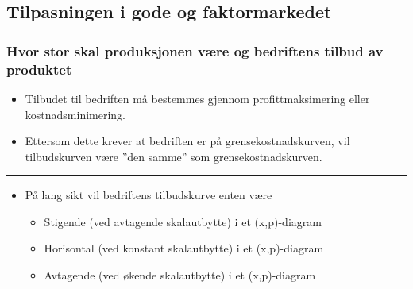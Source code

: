 \documentclass[
  letterpaper,
  DIV=11,
  numbers=noendperiod]{scrartcl}
\providecommand{\tightlist}{%
  \setlength{\itemsep}{0pt}\setlength{\parskip}{0pt}}\usepackage{longtable,booktabs,array}
\begin{document}
\subsection{Tilpasningen i gode og
faktormarkedet}\label{tilpasningen-i-gode-og-faktormarkedet-1}

\subsubsection{Hvor stor skal produksjonen være og bedriftens tilbud av
produktet}\label{hvor-stor-skal-produksjonen-vuxe6re-og-bedriftens-tilbud-av-produktet-1}

\begin{itemize}
\tightlist
\item
  Tilbudet til bedriften må bestemmes gjennom profittmaksimering eller
  kostnadsminimering.\\
\item
  Ettersom dette krever at bedriften er på grensekostnadskurven, vil
  tilbudskurven være ''den samme'' som grensekostnadskurven.
\end{itemize}

\begin{center}\rule{0.5\linewidth}{0.5pt}\end{center}

\begin{itemize}
\tightlist
\item
  På lang sikt vil bedriftens tilbudskurve enten være

  \begin{itemize}
  \tightlist
  \item
    Stigende (ved avtagende skalautbytte) i et (x,p)-diagram
  \item
    Horisontal (ved konstant skalautbytte) i et (x,p)-diagram
  \item
    Avtagende (ved økende skalautbytte) i et (x,p)-diagram
  \end{itemize}
\end{itemize}
\end{document}
